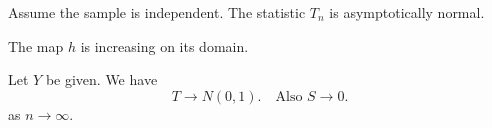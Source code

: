 \begin{thm}\label{thm:clt}
Assume the sample is independent. The statistic $T_n$ is asymptotically normal.
\end{thm}

\begin{prop}\label{prop:mono}
The map $h$ is increasing on its domain.
\end{prop}

\begin{thm}\label{thm:disp}
Let $Y$ be given. We have
\[ T \to N(0,1). \quad \text{Also } S \to 0. \]
as $n \to \infty$.
\end{thm}
